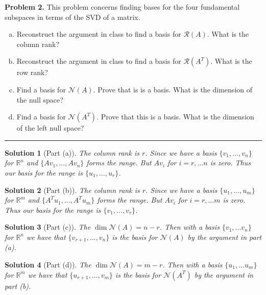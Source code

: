 \documentclass[leqno]{article}
\theoremstyle{nonumberplain}
\newtheorem{solution}{Solution}
\begin{document}
\noindent\textbf{Problem 2.} This problem concerns finding bases for the four fundamental subspaces in terms of the SVD of a matrix.
\begin{enumerate}[(a)]
\item Reconstruct the argument in class to find a basis for $\mathcal{R}(A)$. What is the column rank?
\item Reconstruct the argument in class to find a basis for $\mathcal{R}(A^T)$. What is the row rank?
\item Find a basis for $\mathcal{N}(A)$. Prove that is is a basis. What is the dimension of the null space?
\item Find a basis for $\mathcal{N}(A^T)$. Prove that this is a basis. What is the dimension of the left null space?
\end{enumerate} 

\noindent\rule[0.5ex]{\linewidth}{1pt}

\begin{solution}[Part (a)]
The column rank is $r$. Since we have a basis $\{v_1,...,v_n\}$ for $\mathbb{R}^n$ and $\{Av_1,...,Av_n\}$ forms the range.  But $Av_i$ for $i=r,...n$ is zero. Thus our basis for the range is $\{u_1,...,u_r\}$.
\end{solution}

\begin{solution}[Part (b)]
The column rank is $r$. Since we have a basis $\{u_1,...,u_m\}$ for $\mathbb{R}^m$ and $\{A^T u_1,...,A^T u_m\}$ forms the range.  But $Av_i$ for $i=r,...m$ is zero. Thus our basis for the range is $\{v_1,...,v_r\}$.
\end{solution}

\begin{solution}[Part (c)]
The $\dim\mathcal{N}(A)=n-r$. Then with a basis $\{v_1,...v_n\}$ for $\mathbb{R}^n$ we have that $\{v_{r+1},...,v_{n}\}$ is the basis for $\mathcal{N}(A)$ by the argument in part (a).
\end{solution}

\begin{solution}[Part (d)]
The $\dim\mathcal{N}(A)=m-r$. Then with a basis $\{u_1,...u_m\}$ for $\mathbb{R}^m$ we have that $\{u_{r+1},...,v_{m}\}$ is the basis for $\mathcal{N}(A^T)$ by the argument in part (b).
\end{solution}

\pagebreak


\end{document}
